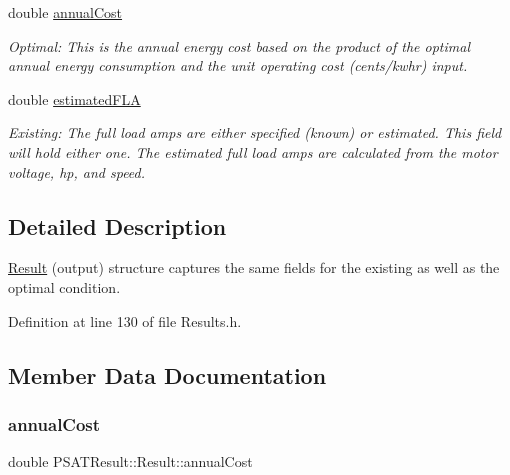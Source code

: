 \begin{DoxyCompactItemize}
double \hyperlink{struct_p_s_a_t_result_1_1_result_a48964ead4e8849f21c2015e226d046cc}{annual\+Cost}
\begin{DoxyCompactList}\small\item\em Optimal\+: This is the annual energy cost based on the product of the optimal annual energy consumption and the unit operating cost (cents/kwhr) input. \end{DoxyCompactList}\item 
\mbox{\label{struct_p_s_a_t_result_1_1_result_ac606acff40adbc7e4b456e37fc0cc2a1}} 
double \hyperlink{struct_p_s_a_t_result_1_1_result_ac606acff40adbc7e4b456e37fc0cc2a1}{estimated\+F\+LA}
\begin{DoxyCompactList}\small\item\em Existing\+: The full load amps are either specified (known) or estimated. This field will hold either one. The estimated full load amps are calculated from the motor voltage, hp, and speed. \end{DoxyCompactList}\end{DoxyCompactItemize}


\subsection{Detailed Description}
\hyperlink{struct_p_s_a_t_result_1_1_result}{Result} (output) structure captures the same fields for the existing as well as the optimal condition. 

Definition at line 130 of file Results.\+h.



\subsection{Member Data Documentation}
\mbox{\label{struct_p_s_a_t_result_1_1_result_a48964ead4e8849f21c2015e226d046cc}} 
\subsubsection{\texorpdfstring{annual\+Cost}{annualCost}}
{\footnotesize\ttfamily double P\+S\+A\+T\+Result\+::\+Result\+::annual\+Cost}



